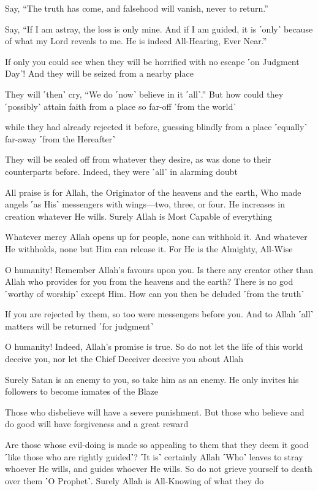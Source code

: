 Say, “The truth has come, and falsehood will vanish, never to return.”

Say, “If I am astray, the loss is only mine. And if I am guided, it is ˹only˺ because of what my Lord reveals to me. He is indeed All-Hearing, Ever Near.”

If only you could see when they will be horrified with no escape ˹on Judgment Day˺! And they will be seized from a nearby place

They will ˹then˺ cry, “We do ˹now˺ believe in it ˹all˺.” But how could they ˹possibly˺ attain faith from a place so far-off ˹from the world˺

while they had already rejected it before, guessing blindly from a place ˹equally˺ far-away ˹from the Hereafter˺

They will be sealed off from whatever they desire, as was done to their counterparts before. Indeed, they were ˹all˺ in alarming doubt

All praise is for Allah, the Originator of the heavens and the earth, Who made angels ˹as His˺ messengers with wings—two, three, or four. He increases in creation whatever He wills. Surely Allah is Most Capable of everything

Whatever mercy Allah opens up for people, none can withhold it. And whatever He withholds, none but Him can release it. For He is the Almighty, All-Wise

O humanity! Remember Allah’s favours upon you. Is there any creator other than Allah who provides for you from the heavens and the earth? There is no god ˹worthy of worship˺ except Him. How can you then be deluded ˹from the truth˺

If you are rejected by them, so too were messengers before you. And to Allah ˹all˺ matters will be returned ˹for judgment˺

O humanity! Indeed, Allah’s promise is true. So do not let the life of this world deceive you, nor let the Chief Deceiver deceive you about Allah

Surely Satan is an enemy to you, so take him as an enemy. He only invites his followers to become inmates of the Blaze

Those who disbelieve will have a severe punishment. But those who believe and do good will have forgiveness and a great reward

Are those whose evil-doing is made so appealing to them that they deem it good ˹like those who are rightly guided˺? ˹It is˺ certainly Allah ˹Who˺ leaves to stray whoever He wills, and guides whoever He wills. So do not grieve yourself to death over them ˹O Prophet˺. Surely Allah is All-Knowing of what they do

